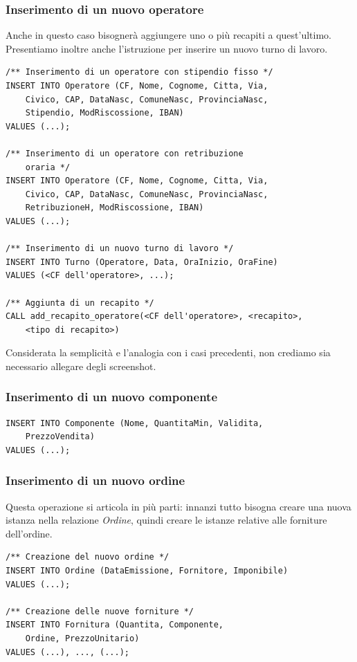 			\subsubsection{Inserimento di un nuovo operatore}
				Anche in questo caso bisognerà aggiungere uno o più recapiti a quest'ultimo. Presentiamo inoltre anche l'istruzione per inserire un nuovo turno di lavoro.
				\begin{lstlisting}
/** Inserimento di un operatore con stipendio fisso */
INSERT INTO Operatore (CF, Nome, Cognome, Citta, Via, 
	Civico, CAP, DataNasc, ComuneNasc, ProvinciaNasc, 
	Stipendio, ModRiscossione, IBAN)
VALUES (...);

/** Inserimento di un operatore con retribuzione
	oraria */
INSERT INTO Operatore (CF, Nome, Cognome, Citta, Via,
	Civico, CAP, DataNasc, ComuneNasc, ProvinciaNasc, 
	RetribuzioneH, ModRiscossione, IBAN)
VALUES (...);

/** Inserimento di un nuovo turno di lavoro */
INSERT INTO Turno (Operatore, Data, OraInizio, OraFine)
VALUES (<CF dell'operatore>, ...);

/** Aggiunta di un recapito */
CALL add_recapito_operatore(<CF dell'operatore>, <recapito>, 
	<tipo di recapito>)
				\end{lstlisting}

        Considerata la semplicità e l'analogia con i casi precedenti, non crediamo sia necessario allegare degli screenshot.


			\subsubsection{Inserimento di un nuovo componente}
				\begin{lstlisting}
INSERT INTO Componente (Nome, QuantitaMin, Validita, 
	PrezzoVendita) 
VALUES (...);
				\end{lstlisting}


			\subsubsection{Inserimento di un nuovo ordine}
				Questa operazione si articola in più parti: innanzi tutto bisogna creare una nuova istanza nella relazione \emph{Ordine}, quindi creare le istanze relative alle forniture dell'ordine.

				\begin{lstlisting}
/** Creazione del nuovo ordine */
INSERT INTO Ordine (DataEmissione, Fornitore, Imponibile) 
VALUES (...);

/** Creazione delle nuove forniture */
INSERT INTO Fornitura (Quantita, Componente, 
	Ordine, PrezzoUnitario)
VALUES (...), ..., (...);
				\end{lstlisting}

